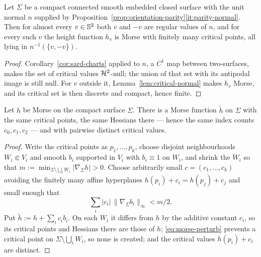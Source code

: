 \begin{lemma}\label{lem:morse-height}
Let $\Sigma$ be a compact connected smooth embedded closed surface with the
unit normal $n$ supplied by
Proposition~\ref{prop:orientation-parity}\ref{it:parity-normal}.  Then for
almost every $v\in\mathbb S^2$ both $v$ and $-v$ are regular values of $n$, and for
every such $v$ the height function $h_v$ is Morse with finitely many critical
points, all lying in $n^{-1}(\{v,-v\})$.
\end{lemma}

\begin{proof}
Corollary~\ref{cor:sard-charts} applied to $n$, a $C^1$ map between
two-surfaces, makes the set of critical values $\mathcal H^2$-null; the union of that
set with its antipodal image is still null.  For $v$ outside it,
Lemma~\ref{lem:critical-normal} makes $h_v$ Morse, and its critical set is
then discrete and compact, hence finite.
\end{proof}

\begin{lemma}\label{lem:morse-distinct}
Let $h$ be Morse on the compact surface $\Sigma$.  There is a Morse function
$\widetilde h$ on $\Sigma$ with the same critical points, the same Hessians
there --- hence the same index counts $c_0,c_1,c_2$ --- and with pairwise
distinct critical values.
\end{lemma}

\begin{proof}
Write the critical points as $p_1,\dots,p_k$, choose disjoint neighbourhoods
$W_i\Subset V_i$ and smooth $b_i$ supported in $V_i$ with $b_i\equiv1$ on
$W_i$, and shrink the $W_i$ so that
$m:=\min_{\Sigma\setminus\bigcup_iW_i}|\nabla_\Sigma h|>0$.  Choose
arbitrarily small $c=(c_1,\dots,c_k)$ avoiding the finitely many affine
hyperplanes $h(p_i)+c_i=h(p_j)+c_j$ and small enough that
\begin{equation}\label{eq:morse-perturb}
  \sum_i|c_i|\,\|\nabla_\Sigma b_i\|_\infty<m/2 .
\end{equation}
Put $\widetilde h:=h+\sum_ic_ib_i$.  On each $W_i$ it differs from $h$ by the
additive constant $c_i$, so its critical points and Hessians there are those
of $h$; \eqref{eq:morse-perturb} prevents a critical point on
$\Sigma\setminus\bigcup_iW_i$, so none is created; and the critical values
$h(p_i)+c_i$ are distinct.
\end{proof}

